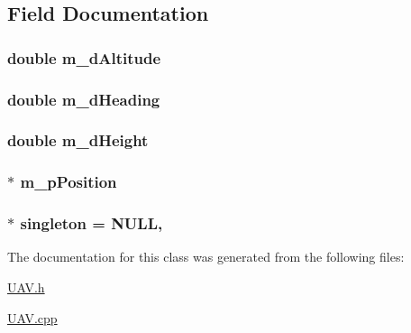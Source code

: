 \subsection{Field Documentation}
\hypertarget{a00013_a79a2bd07a373f3b0042e6c2dc0e51fc0}{
\subsubsection[{m\-\_\-d\-Altitude}]{\setlength{\rightskip}{0pt plus 5cm}double m\-\_\-d\-Altitude\hspace{0.3cm}{\ttfamily [private]}}}\label{a00013_a79a2bd07a373f3b0042e6c2dc0e51fc0}
\hypertarget{a00013_a610bb35047703e6c2c0176285cd09312}{
\subsubsection[{m\-\_\-d\-Heading}]{\setlength{\rightskip}{0pt plus 5cm}double m\-\_\-d\-Heading\hspace{0.3cm}{\ttfamily [private]}}}\label{a00013_a610bb35047703e6c2c0176285cd09312}
\hypertarget{a00013_a56427301298e19fe48b131d43376abce}{
\subsubsection[{m\-\_\-d\-Height}]{\setlength{\rightskip}{0pt plus 5cm}double m\-\_\-d\-Height\hspace{0.3cm}{\ttfamily [private]}}}\label{a00013_a56427301298e19fe48b131d43376abce}
\hypertarget{a00013_a0af541d1b4b8c59e4385c003e377b746}{
\subsubsection[{m\-\_\-p\-Position}]{$\ast$ m\-\_\-p\-Position\hspace{0.3cm}{\ttfamily [private]}}}\label{a00013_a0af541d1b4b8c59e4385c003e377b746}
\hypertarget{a00013_a07b6432074b71e811b0b6eb21b94e835}{
\subsubsection[{singleton}]{ $\ast$ singleton = N\-U\-L\-L\hspace{0.3cm}{\ttfamily [static]}, {\ttfamily [private]}}}\label{a00013_a07b6432074b71e811b0b6eb21b94e835}


The documentation for this class was generated from the following files\-:\begin{DoxyCompactItemize}
\item 
\hyperlink{a00039}{U\-A\-V.\-h}\item 
\hyperlink{a00038}{U\-A\-V.\-cpp}\end{DoxyCompactItemize}
